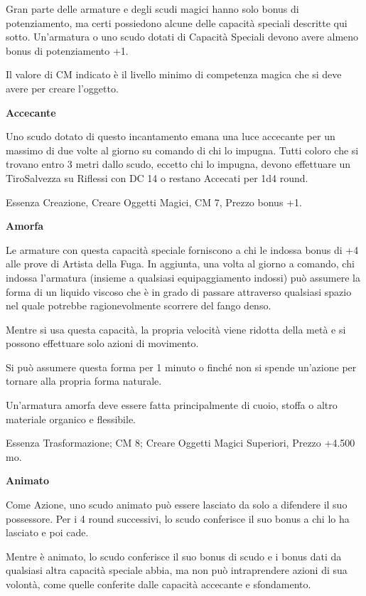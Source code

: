 \documentclass[a4paper,11pt,twoside,openany]{book}
\begin{document}
\label{descrizione-delle-capacita-speciali-delle-armature-e-scudi-magici}

Gran parte delle armature e degli scudi magici hanno solo bonus di potenziamento, ma certi possiedono alcune delle capacità speciali descritte qui sotto. Un'armatura o uno scudo dotati di Capacità Speciali devono avere almeno bonus di potenziamento +1.

Il valore di CM indicato è il livello minimo di competenza magica che si deve avere per creare l'oggetto.

\textbf{Accecante}

Uno scudo dotato di questo incantamento emana una luce accecante per un massimo di due volte al giorno su comando di chi lo impugna. Tutti coloro che si trovano entro 3 metri dallo scudo, eccetto chi lo impugna, devono effettuare un TiroSalvezza su Riflessi con DC 14 o restano Accecati per 1d4 round.

Essenza Creazione, Creare Oggetti Magici, CM 7, Prezzo bonus +1.

\textbf{Amorfa}

Le armature con questa capacità speciale forniscono a chi le indossa bonus di +4 alle prove di Artista della Fuga. In aggiunta, una volta al giorno a comando, chi indossa l'armatura (insieme a qualsiasi equipaggiamento indossi) può assumere la forma di un liquido viscoso che è in grado di passare attraverso qualsiasi spazio nel quale potrebbe ragionevolmente scorrere del fango denso.

Mentre si usa questa capacità, la propria velocità viene ridotta della metà e si possono effettuare solo azioni di movimento.

Si può assumere questa forma per 1 minuto o finché non si spende un'azione per tornare alla propria forma naturale.

Un'armatura amorfa deve essere fatta principalmente di cuoio, stoffa o altro materiale organico e flessibile.

Essenza Trasformazione; CM 8; Creare Oggetti Magici Superiori, Prezzo
+4.500 mo.

\textbf{Animato}

Come Azione, uno scudo animato può essere lasciato da solo a difendere il suo possessore. Per i 4 round successivi, lo scudo conferisce il suo bonus a chi lo ha lasciato e poi cade.

Mentre è animato, lo scudo conferisce il suo bonus di scudo e i bonus dati da qualsiasi altra capacità speciale abbia, ma non può intraprendere azioni di sua volontà, come quelle conferite dalle capacità accecante e sfondamento.
\end{document}
